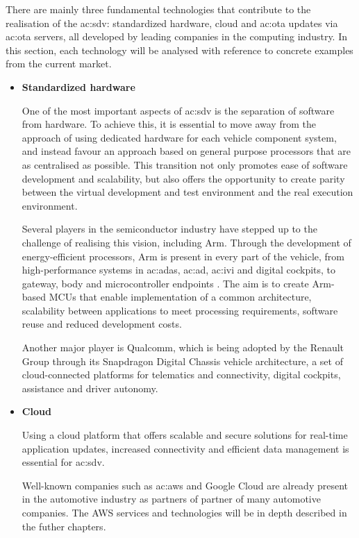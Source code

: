 There are mainly three fundamental technologies that contribute to the realisation of the \gls{ac:sdv}: standardized hardware, cloud and \gls{ac:ota} updates via \gls{ac:ota} servers, all developed by leading companies in the computing industry. In this section, each technology will be analysed with reference to concrete examples from the current market.

\begin{itemize}
    \item \textbf{Standardized hardware} 
    
    One of the most important aspects of \gls{ac:sdv} is the separation of software from hardware. To achieve this, it is essential to move away from the approach of using dedicated hardware for each vehicle component system, and instead favour an approach based on general purpose processors that are as centralised as possible. This transition not only promotes ease of software development and scalability, but also offers the opportunity to create parity between the virtual development and test environment and the real execution environment.
    
    Several players in the semiconductor industry have stepped up to the challenge of realising this vision, including Arm. Through the development of energy-efficient processors, Arm is present in every part of the vehicle, from high-performance systems in \gls{ac:adas}, \gls{ac:ad}, \gls{ac:ivi} and digital cockpits, to gateway, body and microcontroller endpoints \cite{ArmAutomotive}. The aim is to create Arm-based MCUs that enable implementation of a common architecture, scalability between applications to meet processing requirements, software reuse and reduced development costs.
    
    Another major player is Qualcomm, which is being adopted by the Renault Group through its Snapdragon Digital Chassis vehicle architecture, a set of cloud-connected platforms for telematics and connectivity, digital cockpits, assistance and driver autonomy.

    \item \textbf{Cloud} 
    
    Using a cloud platform that offers scalable and secure solutions for real-time application updates, increased connectivity and efficient data management is essential for \gls{ac:sdv}. 

    Well-known companies such as \gls{ac:aws} and Google Cloud are already present in the automotive industry as partners of partner of many automotive companies. The AWS services and technologies will be in depth described in the futher chapters.
 

\end{itemize}
